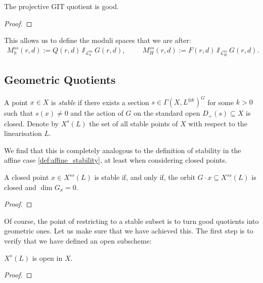\documentclass[12pt]{ociamthesis}  %
\begin{document}
\begin{theorem}
  The projective GIT quotient is good.
  \begin{proof}
    \missingproof
  \end{proof}
\end{theorem}

\begin{example}
  This allows us to define the moduli spaces that we are after:
  \begin{align*}
    M^{ss}_h(r,d) := Q(r,d)\sslash_{{\mathscr L}^m_h} G(r,d), \hspace{1cm}
    M^{ss}_H(r,d) := F(r,d)\sslash_{{\mathscr L}^m_H} G(r,d).
  \end{align*}
  \missingexample
\end{example}

\missingsection

\subsection{Geometric Quotients}

\begin{definition}
  A point $x\in X$ is \emph{stable} if there exists a section
  $s\in\Gamma(X,L^{\otimes k})^G$ for some $k>0$ such that $s(x)\neq 0$
  and the action of $G$ on the standard open $D_+(s)\subseteq X$ is closed.
  Denote by $X^s(L)$ the set of all stable points of $X$ with respect
  to the linearisation $L$.
\end{definition}

We find that this is completely analogous to the definition
of stability in the affine case \ref{def:affine_stability}, at
least when considering closed points.

\begin{lemma}
  A closed point $x\in X^{ss}(L)$ is stable if, and only if, the orbit
  $G\cdot x\subseteq X^{ss}(L)$ is closed and $\dim G_x = 0$.
  \begin{proof}
    \missingproof
  \end{proof}
\end{lemma}

Of course, the point of restricting to a stable subset is to turn
good quotients into geometric ones. Let us make sure that we have
achieved this. The first step is to verify that we have defined
an open subscheme:

\begin{lemma}
  $X^s(L)$ is open in $X$.
  \begin{proof}
    \missingproof
  \end{proof}
\end{lemma}
\end{document}
